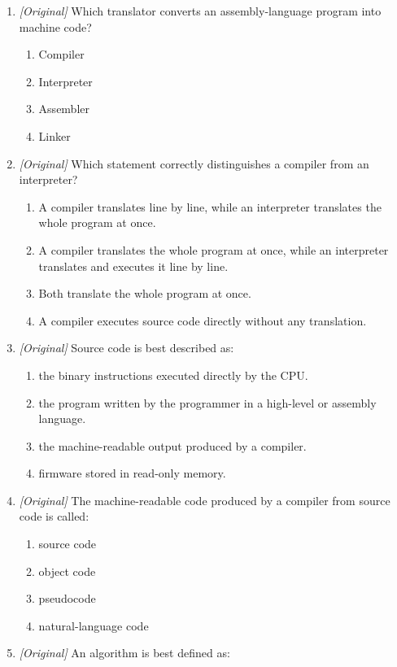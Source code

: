 \documentclass[11pt]{article}
\begin{document}
\begin{enumerate}[label=\textbf{Q\arabic*.}, leftmargin=*]
\begin{enumerate}[label=\Alph*.]
  \end{enumerate}
\item \textit{[Original]} Which translator converts an assembly-language
  program into machine code?
  \begin{enumerate}[label=\Alph*.]
    \item Compiler
    \item Interpreter
    \item Assembler
    \item Linker
  \end{enumerate}
\item \textit{[Original]} Which statement correctly distinguishes a compiler
  from an interpreter?
  \begin{enumerate}[label=\Alph*.]
    \item A compiler translates line by line, while an interpreter translates
      the whole program at once.
    \item A compiler translates the whole program at once, while an
      interpreter translates and executes it line by line.
    \item Both translate the whole program at once.
    \item A compiler executes source code directly without any translation.
  \end{enumerate}
\item \textit{[Original]} Source code is best described as:
  \begin{enumerate}[label=\Alph*.]
    \item the binary instructions executed directly by the CPU.
    \item the program written by the programmer in a high-level or assembly
      language.
    \item the machine-readable output produced by a compiler.
    \item firmware stored in read-only memory.
  \end{enumerate}
\item \textit{[Original]} The machine-readable code produced by a compiler
  from source code is called:
  \begin{enumerate}[label=\Alph*.]
    \item source code
    \item object code
    \item pseudocode
    \item natural-language code
  \end{enumerate}
\item \textit{[Original]} An algorithm is best defined as:

\end{enumerate}
\end{document}
